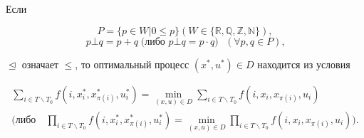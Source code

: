 \smallskip



\hypertarget{ovch:zam2}{}



\begin{remark}[2]

Если 

$$P=\{p\in W\vert 0\le p\}(W\in \{\mathbb{R}, \mathbb{Q}, \mathbb{Z}, \mathbb{N}\}),$$  $$p\bot

q=p+q \; \text{$($либо $p\bot q=p\cdot q)$ $(\forall p,q\in P)$,}$$ 

$\trianglelefteq$ означает $\le$, то оптимальный процесс $(x^\ast,u^\ast)\in D$ находится из условия

\begin{gather*}

\sum _{i\in T\backslash T_0 } f(i,x_i^\ast,x_{\pi

(i)}^\ast,u_i^\ast )=\min \limits_{(x,u)\in D}

\sum _{i\in T\backslash T_0 } f(i,x_i,x_{\pi (i)},u_i)\\

\biggl(\text{либо} \quad \prod _{i\in T\backslash T_0 } f(i,x_i^\ast,x_{\pi (i)}^\ast ,u_i^\ast)=\min

\limits_{(x,u)\in D} \prod _{i\in T\backslash T_0}

f(i,x_i,x_{\pi (i)},u_i) \biggr).

\end{gather*}

\end{remark}



\smallskip



\hypertarget{ovch:zam3}{}




